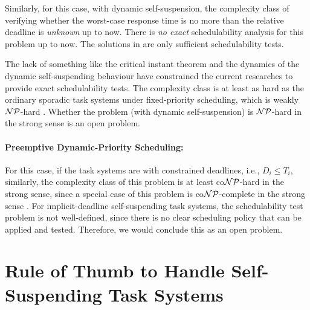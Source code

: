 Similarly, for this case, with dynamic self-suspension, the complexity class of verifying whether the worst-case response time is no more than the relative deadline is \emph{unknown} up to now. There is \emph{no exact} schedulability analysis for this problem up to now. The solutions in \cite{Liu:2000:RS:518501}\cite{LiuChen:rtss2014}\cite{huangpass:dac2015} are only sufficient schedulability tests. 

The lack of something like the critical instant theorem and the dynamics of the dynamic self-suspending behaviour have constrained the current researches to provide exact schedulability tests. The complexity class is at least as hard as the ordinary sporadic task systems under fixed-priority scheduling, which is weakly ${\cal NP}$-hard \cite{EisenbrandR08}. Whether the problem (with dynamic self-suspension) is ${\cal NP}$-hard in the strong sense is an open problem.

\paragraph{Preemptive Dynamic-Priority Scheduling:} 
For this case, if the task systems are with constrained deadlines, i.e., $D_i \leq T_i$, similarly, the complexity class of this problem is at least co${\cal NP}$-hard in the strong sense, since a special case of this problem is co${\cal NP}$-complete in the strong sense \cite{DBLP:conf/ecrts/Ekberg015}. For implicit-deadline self-suspending task systems, the schedulability test problem is not well-defined, since there is no clear scheduling policy that can be applied and tested. Therefore, we would conclude this as an open problem.

  
\section{Rule of Thumb to Handle Self-Suspending Task Systems}